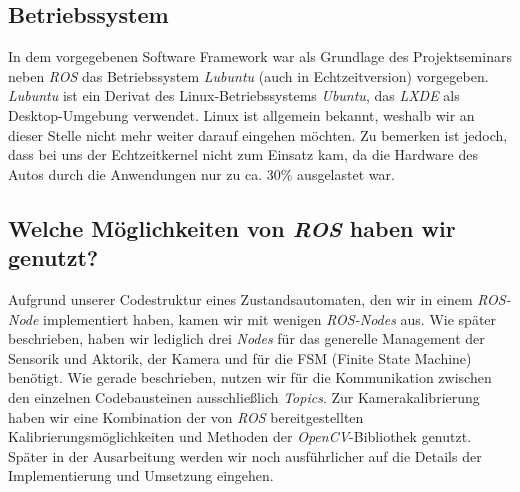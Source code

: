 \subsection{Betriebssystem}
In dem vorgegebenen Software Framework war als Grundlage des Projektseminars neben \textit{ROS} das Betriebssystem \textit{Lubuntu} (auch in Echtzeitversion) vorgegeben. \textit{Lubuntu} ist ein Derivat des Linux-Betriebssystems \textit{Ubuntu}, das \textit{LXDE} als Desktop-Umgebung verwendet. Linux ist allgemein bekannt, weshalb wir an dieser Stelle nicht mehr weiter darauf eingehen möchten. 
Zu bemerken ist jedoch, dass bei uns der Echtzeitkernel nicht zum Einsatz kam, da die Hardware des Autos durch die Anwendungen nur zu ca. 30\% ausgelastet war. 

\subsection{Welche Möglichkeiten von \textit{ROS} haben wir genutzt?}
Aufgrund unserer Codestruktur eines Zustandsautomaten, den wir in einem \textit{ROS-Node} implementiert haben, kamen wir mit wenigen \textit{ROS-Nodes} aus. Wie später beschrieben, haben wir lediglich drei \textit{Nodes} für das generelle Management der Sensorik und Aktorik, der Kamera und für die FSM (Finite State Machine) benötigt. Wie gerade beschrieben, nutzen wir für die Kommunikation zwischen den einzelnen Codebausteinen ausschließlich \textit{Topics}.
Zur Kamerakalibrierung haben wir eine Kombination der von \textit{ROS} bereitgestellten Kalibrierungsmöglichkeiten und Methoden der \textit{OpenCV}-Bibliothek genutzt. Später in der Ausarbeitung werden wir noch ausführlicher auf die Details der Implementierung und Umsetzung eingehen.  
